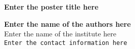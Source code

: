 \documentclass[a0,portrait]{a0poster}
\def \mytitle{Enter the poster title here}
\def \authors{Enter the name of the authors here}
\def \contact{Enter the contact information here}
\def \institu{Enter the name of the institute here}
\begin{document}

\begin{minipage}[b]{0.8\linewidth}
\begin{center}
\Huge \color{FireBrick} \textbf{\mytitle} \color{Black}\\ %
\end{center}

\begin{center}
\LARGE \textbf{\authors}\\[0.25cm] %
\Large \institu \\[0.1cm] %
\large \texttt{\contact}\\
\end{center}
\end{minipage}
%
\begin{minipage}[b]{0.2\linewidth}
\end{minipage}

\noindent\makebox[\linewidth]{\rule{\linewidth}{5.6pt}}
\end{document}
